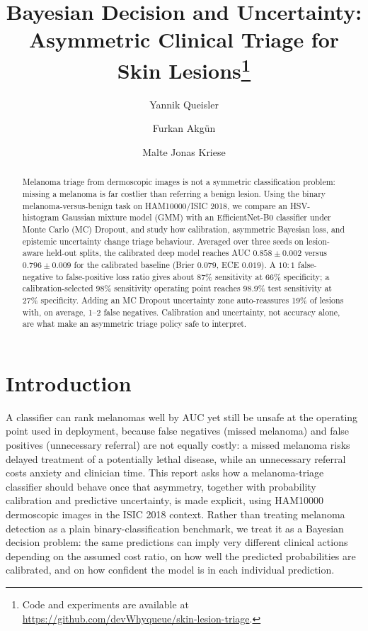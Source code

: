\documentclass[10pt,a4paper]{article}
\title{Bayesian Decision and Uncertainty:\\Asymmetric Clinical Triage for Skin Lesions\thanks{Code and experiments are available at \url{https://github.com/devWhyqueue/skin-lesion-triage}.}}
\author{Yannik Queisler \and Furkan Akg\"un \and Malte Jonas Kriese}
\date{}
\begin{document}
\maketitle
\vspace{-1.5em}

\begin{abstract}
\noindent Melanoma triage from dermoscopic images is not a symmetric classification problem: missing a melanoma is far costlier than referring a benign lesion. Using the binary melanoma-versus-benign task on HAM10000/ISIC 2018, we compare an HSV-histogram Gaussian mixture model (GMM) with an EfficientNet-B0 classifier under Monte Carlo (MC) Dropout, and study how calibration, asymmetric Bayesian loss, and epistemic uncertainty change triage behaviour. Averaged over three seeds on lesion-aware held-out splits, the calibrated deep model reaches AUC $0.858\pm0.002$ versus $0.796\pm0.009$ for the calibrated baseline (Brier $0.079$, ECE $0.019$). A $10{:}1$ false-negative to false-positive loss ratio gives about 87\% sensitivity at 66\% specificity; a calibration-selected 98\% sensitivity operating point reaches 98.9\% test sensitivity at 27\% specificity. Adding an MC Dropout uncertainty zone auto-reassures 19\% of lesions with, on average, 1--2 false negatives. Calibration and uncertainty, not accuracy alone, are what make an asymmetric triage policy safe to interpret.
\end{abstract}

\section{Introduction}
A classifier can rank melanomas well by AUC yet still be unsafe at the operating point used in deployment, because false negatives (missed melanoma) and false positives (unnecessary referral) are not equally costly: a missed melanoma risks delayed treatment of a potentially lethal disease, while an unnecessary referral costs anxiety and clinician time. This report asks how a melanoma-triage classifier should behave once that asymmetry, together with probability calibration and predictive uncertainty, is made explicit, using HAM10000 dermoscopic images in the ISIC 2018 context. Rather than treating melanoma detection as a plain binary-classification benchmark, we treat it as a Bayesian decision problem: the same predictions can imply very different clinical actions depending on the assumed cost ratio, on how well the predicted probabilities are calibrated, and on how confident the model is in each individual prediction.
\end{document}
